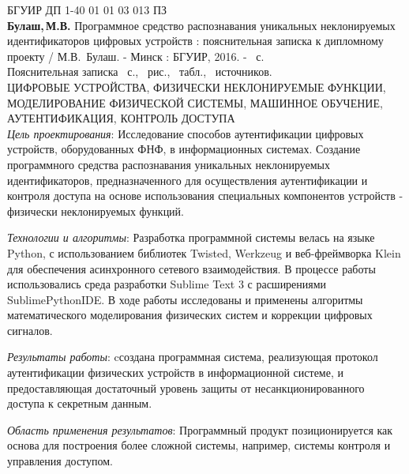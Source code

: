 \thispagestyle{empty}
\noindent БГУИР ДП 1-40 01 01 03 013 ПЗ
\\

\textbf{Булаш,\,М.В.} Программное средство распознавания уникальных неклонируемых идентификаторов цифровых устройств : пояснительная записка к дипломному проекту / М.В.~Булаш. - Минск : БГУИР, 2016. - \pageref*{LastPage}~с.
\\

Пояснительная записка \pageref*{LastPage}~с., \totfig{}~рис., \tottab{}~табл., \totref{}~источников.
\\

\MakeUppercase{цифровые устройства, физически неклонируемые функции, моделирование физической системы, машинное обучение, аутентификация, контроль доступа}
\\

\emph{Цель проектирования}: Исследование способов аутентификации цифровых устройств, оборудованных ФНФ, в информационных системах. Создание программного средства распознавания уникальных неклонируемых идентификаторов, предназначенного для осуществления аутентификации и контроля доступа на основе использования специальных компонентов устройств - физически неклонируемых функций.

\emph{Технологии и алгоритмы}: Разработка программной системы велась на языке Python, с использованием библиотек Twisted, Werkzeug и веб-фреймворка Klein для обеспечения асинхронного сетевого взаимодействия. В процессе работы использовались среда разработки Sublime Text 3 с расширениями SublimePythonIDE. В ходе работы исследованы и применены алгоритмы математического моделирования физических систем и коррекции цифровых сигналов.

\emph{Результаты работы}: cсоздана программная система, реализующая протокол аутентификации физических устройств в информационной системе, и предоставляющая достаточный уровень защиты от несанкционированного доступа к секретным данным.

\emph{Область применения результатов}: Программный продукт позиционируется как основа для построения более сложной системы, например, системы контроля и управления доступом.


\clearpage
